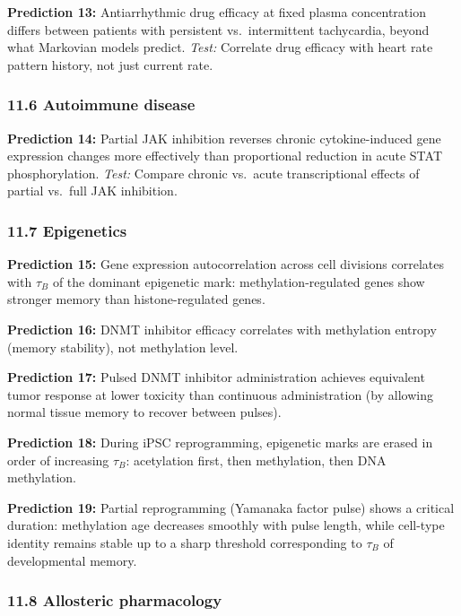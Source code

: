 \documentclass[
]{article}
\begin{document}
\textbf{Prediction 13:} Antiarrhythmic drug efficacy at fixed plasma
concentration differs between patients with persistent vs.~intermittent
tachycardia, beyond what Markovian models predict. \emph{Test:}
Correlate drug efficacy with heart rate pattern history, not just
current rate.

\hypertarget{autoimmune-disease-1}{%
\subsubsection{11.6 Autoimmune disease}\label{autoimmune-disease-1}}

\textbf{Prediction 14:} Partial JAK inhibition reverses chronic
cytokine-induced gene expression changes more effectively than
proportional reduction in acute STAT phosphorylation. \emph{Test:}
Compare chronic vs.~acute transcriptional effects of partial vs.~full
JAK inhibition.

\hypertarget{epigenetics}{%
\subsubsection{11.7 Epigenetics}\label{epigenetics}}

\textbf{Prediction 15:} Gene expression autocorrelation across cell
divisions correlates with \(\tau_B\) of the dominant epigenetic mark:
methylation-regulated genes show stronger memory than histone-regulated
genes.

\textbf{Prediction 16:} DNMT inhibitor efficacy correlates with
methylation entropy (memory stability), not methylation level.

\textbf{Prediction 17:} Pulsed DNMT inhibitor administration achieves
equivalent tumor response at lower toxicity than continuous
administration (by allowing normal tissue memory to recover between
pulses).

\textbf{Prediction 18:} During iPSC reprogramming, epigenetic marks are
erased in order of increasing \(\tau_B\): acetylation first, then
methylation, then DNA methylation.

\textbf{Prediction 19:} Partial reprogramming (Yamanaka factor pulse)
shows a critical duration: methylation age decreases smoothly with pulse
length, while cell-type identity remains stable up to a sharp threshold
corresponding to \(\tau_B\) of developmental memory.

\hypertarget{allosteric-pharmacology}{%
\subsubsection{11.8 Allosteric
pharmacology}\label{allosteric-pharmacology}}
\end{document}
